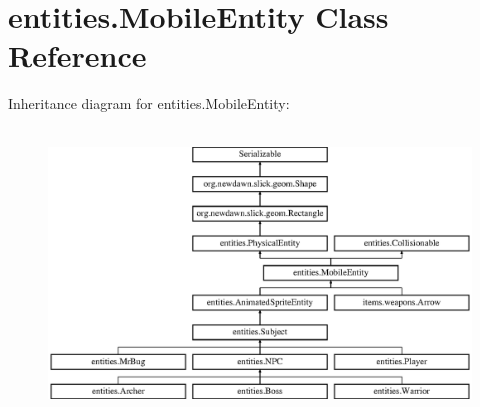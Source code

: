 \hypertarget{classentities_1_1_mobile_entity}{}\section{entities.\+Mobile\+Entity Class Reference}
\label{classentities_1_1_mobile_entity}
Inheritance diagram for entities.\+Mobile\+Entity\+:\begin{figure}[H]
\begin{center}
\leavevmode
\includegraphics[height=7.671233cm]{classentities_1_1_mobile_entity}
\end{center}
\end{figure}
